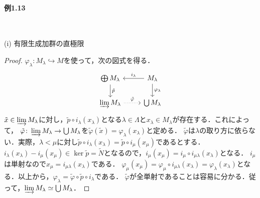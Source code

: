 \paragraph{例1.13}~
\begin{screen}
  (i) 有限生成加群の直極限
\end{screen}
\begin{proof}
  $\varphi_\lambda\colon M_\lambda \hookrightarrow M$を使って，次の図式を得る．
  \[
  \begin{tikzcd}
    \bigoplus M_\lambda\arrow[d, "\tilde{p}"] & M_\lambda \arrow[l, "i_\lambda"']\arrow[d, "\varphi_\lambda"] \\
    \varinjlim M_\lambda \arrow[r, "\tilde{\varphi}", dotted] & \bigcup M_\lambda
  \end{tikzcd}
  \]
  $\tilde{x} \in \varinjlim M_\lambda$に対し，$\tilde{p} \circ i_\lambda (x_\lambda)$となる$\lambda \in \Lambda$と$x_\lambda \in M_\lambda$が存在する．これによって，
  $\tilde{\varphi}\colon \varinjlim M_\lambda \to \bigcup M_\lambda$を$\tilde{\varphi}(\tilde{x}) = \varphi_\lambda(x_\lambda)$と定める．
  $\tilde{\varphi}$は$\lambda$の取り方に依らない．実際，$\lambda < \mu$に対し$\tilde{p} \circ i_\lambda (x_\lambda) = \tilde{p} \circ i_\mu (x_\mu)$であるとする．
  $i_\lambda (x_\lambda) - i_\mu (x_\mu) \in \ker \tilde{p} = \tilde{N}$となるので，$i_\mu (x_\mu) = i_\mu \circ i_{\mu\lambda} (x_\lambda)$となる．
  $i_\mu$は単射なので$x_\mu = i_{\mu\lambda} (x_\lambda)$である．
  $\varphi_\mu(x_\mu) = \varphi_\mu \circ i_{\mu\lambda} (x_\lambda) = \varphi_\lambda(x_\lambda)$となる．以上から，$\varphi_\lambda = \tilde{\varphi} \circ \tilde{p} \circ i_\lambda$である．
  $\tilde{\varphi}$が全単射であることは容易に分かる．従って，$\varinjlim M_\lambda \simeq \bigcup M_\lambda$．
\end{proof}

